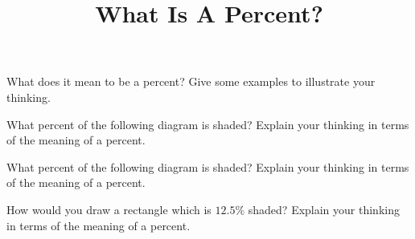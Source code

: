 \documentclass[nooutcomes,noauthor]{ximera}
\title{What Is A Percent?}
\begin{document}
\begin{abstract}\end{abstract}
\maketitle

\begin{problem}
 What does it mean to be a percent? Give some examples to illustrate your thinking.
\end{problem}

\begin{problem}
What percent of the following diagram is shaded? Explain your thinking in terms of the meaning of a percent.
\begin{center}
\end{center}
\end{problem}


\begin{problem}
What percent of the following diagram is shaded? Explain your thinking in terms of the meaning of a percent.
\begin{center}
\end{center}
\end{problem}


\begin{problem}
How would you draw a rectangle which is $12.5\%$ shaded? Explain your thinking in terms of the meaning of a percent.
\end{problem}



\newpage
\end{document}
